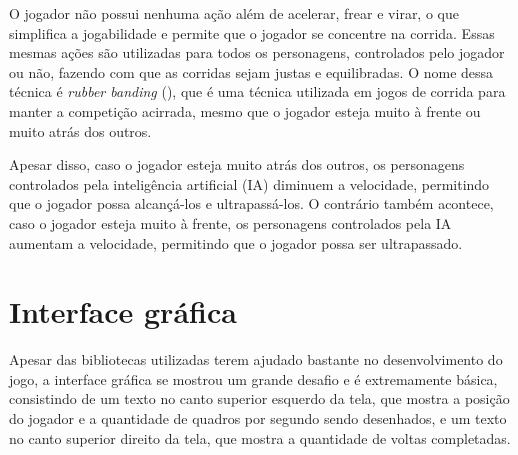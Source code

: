 O jogador não possui nenhuma ação além de acelerar, frear e virar, o que simplifica a jogabilidade e permite que o jogador se concentre na corrida. Essas mesmas ações são utilizadas para todos os personagens, controlados pelo jogador ou não, fazendo com que as corridas sejam justas e equilibradas. O nome dessa técnica é \textit{rubber banding} (\cite{rubberBandAi}), que é uma técnica utilizada em jogos de corrida para manter a competição acirrada, mesmo que o jogador esteja muito à frente ou muito atrás dos outros.

Apesar disso, caso o jogador esteja muito atrás dos outros, os personagens controlados pela inteligência artificial (IA) diminuem a velocidade, permitindo que o jogador possa alcançá-los e ultrapassá-los. O contrário também acontece, caso o jogador esteja muito à frente, os personagens controlados pela IA aumentam a velocidade, permitindo que o jogador possa ser ultrapassado.

\section{Interface gráfica}

Apesar das bibliotecas utilizadas terem ajudado bastante no desenvolvimento do jogo, a interface gráfica se mostrou um grande desafio e é extremamente básica, consistindo de um texto no canto superior esquerdo da tela, que mostra a posição do jogador e a quantidade de quadros por segundo sendo desenhados, e um texto no canto superior direito da tela, que mostra a quantidade de voltas completadas.
